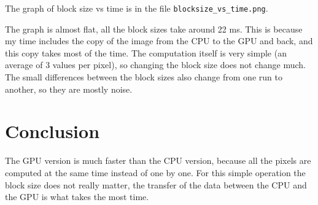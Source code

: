 \documentclass{report}
\begin{document}
The graph of block size vs time is in the file \texttt{blocksize\_vs\_time.png}.

The graph is almost flat, all the block sizes take around 22 ms. This is because my time
includes the copy of the image from the CPU to the GPU and back, and this copy takes most
of the time. The computation itself is very simple (an average of 3 values per pixel), so
changing the block size does not change much. The small differences between the block sizes
also change from one run to another, so they are mostly noise.

\section*{Conclusion}

The GPU version is much faster than the CPU version, because all the pixels are computed at
the same time instead of one by one. For this simple operation the block size does not really
matter, the transfer of the data between the CPU and the GPU is what takes the most time.
\end{document}
